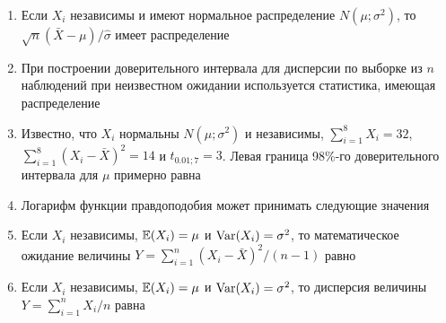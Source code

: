 \documentclass[12pt, a4paper]{article}\usepackage[]{graphicx}\usepackage[]{color}
\begin{document}
\begin{enumerate}

\item Если $X_i$ независимы и имеют нормальное распределение $N(\mu;\sigma^2)$, то $\sqrt{n}(\bar{X}-\mu)/\hat{\sigma}$ имеет распределение


\item При построении доверительного интервала для дисперсии по выборке из $n$ наблюдений при неизвестном ожидании используется статистика, имеющая распределение


\item Известно, что $X_i$ нормальны $N(\mu;\sigma^2)$ и независимы, $\sum_{i=1}^8 X_i=32$, $\sum_{i=1}^8 (X_i-\bar{X})^2=14$ и $t_{0.01;7}=3$. Левая граница 98\%-го доверительного интервала для $\mu$ примерно равна



\item Логарифм функции правдоподобия может принимать следующие значения

\otvet{$[0;1]$}{$(-\infty;0]$}{$(-\infty;+\infty)$}{$[0;+\infty)$}{$[-1;1]$}

\item Если $X_i$ независимы, $\mathbb{E}(X_i)=\mu$ и $\operatorname{Var}(X_i)=\sigma^2$, то математическое ожидание величины $Y=\sum_{i=1}^{n}(X_i-\bar{X})^2/(n-1)$ равно


\item Если $X_i$ независимы, $\mathbb{E}(X_i)=\mu$ и $\operatorname{Var}(X_i)=\sigma^2$, то дисперсия величины $Y=\sum_{i=1}^{n}X_i/n$ равна



\end{enumerate}
\end{document}
